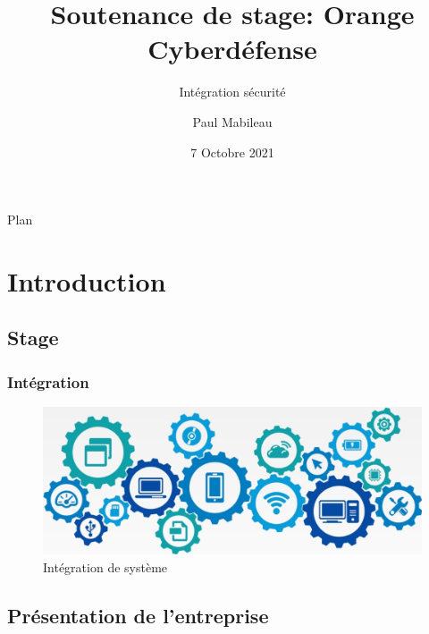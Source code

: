 \documentclass[french, a4paper]{beamer}
\title{Soutenance de stage: Orange Cyberdéfense}
\subtitle{Intégration sécurité}
\author{Paul Mabileau}
\institute{Télécom SudParis}
\date{7 Octobre 2021}
\begin{document}
\begin{frame}
    \titlepage{}
\end{frame}

\begin{frame}
    \begin{center}
        {\Large Plan}
    \end{center}
    \tableofcontents[subsubsectionstyle = hide]
\end{frame}


\section{Introduction}
\subsection{Stage}

\begin{frame}
    \frametitle{Intégration}
    \begin{figure}[h!]
        \centering
        \includegraphics[width = \linewidth]{img/misc/integ.png}
        \caption{Intégration de système}%
        \label{fig:misc/integ}
    \end{figure}
\end{frame}

\subsection{Présentation de l'entreprise}
\end{document}
